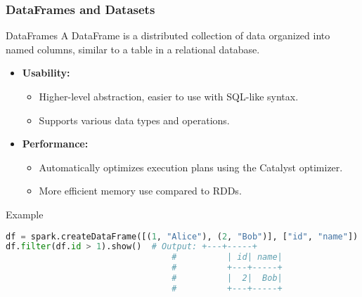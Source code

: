 \documentclass{beamer}
\begin{document}
\begin{frame}[fragile]
    \frametitle{DataFrames and Datasets}
    \begin{block}{DataFrames}
        A DataFrame is a distributed collection of data organized into named columns, similar to a table in a relational database.
    \end{block}

    \begin{itemize}
        \item \textbf{Usability:}
        \begin{itemize}
            \item Higher-level abstraction, easier to use with SQL-like syntax.
            \item Supports various data types and operations.
        \end{itemize}
        \item \textbf{Performance:}
        \begin{itemize}
            \item Automatically optimizes execution plans using the Catalyst optimizer.
            \item More efficient memory use compared to RDDs.
        \end{itemize}
    \end{itemize}
    
    \begin{block}{Example}
    \begin{lstlisting}[language=Python]
df = spark.createDataFrame([(1, "Alice"), (2, "Bob")], ["id", "name"])
df.filter(df.id > 1).show()  # Output: +---+-----+
                                 #          | id| name|
                                 #          +---+-----+
                                 #          |  2|  Bob|
                                 #          +---+-----+
    \end{lstlisting}
    \end{block}

\end{frame}
\end{document}
